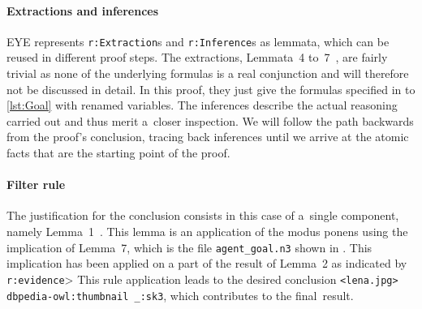 \vspace{-1em}

\paragraph{\bfseries Extractions and inferences}
EYE represents \verb!r:Extraction!s and \verb!r:Inference!s as lemmata,
which can be reused in different proof steps.
The extractions, Lemmata~4 to~7~, are fairly trivial as none of the underlying formulas is a real conjunction and will therefore not be discussed in detail.
In this proof, they just give the formulas specified in  to \ref{lst:Goal} with renamed variables.
The inferences describe the actual reasoning carried out
and thus merit a~closer inspection.
We will follow the path backwards from the proof's conclusion,
tracing back inferences until we arrive at the atomic facts
that are the starting point of the proof.

\vspace{-1em}

\paragraph{\bfseries Filter rule}
The justification for the conclusion
consists in this case of a~single component, namely Lemma~1~.
This lemma is an application of the modus ponens using the implication of Lemma~7,
which is the file \verb!agent_goal.n3! shown in .
This implication has been applied on
 a part of the result of Lemma~2 as indicated by \verb!r:evidence!> %
This rule application leads to the desired conclusion
\verb!<lena.jpg> dbpedia-owl:thumbnail _:sk3!,
which contributes to the final~result.

\vspace{-1em}

